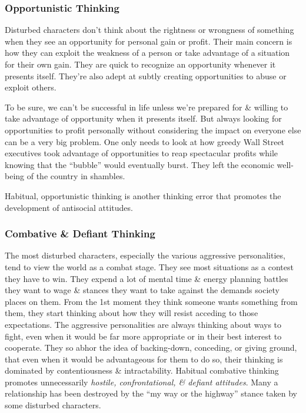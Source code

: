 \documentclass{article}
\numberwithin{equation}{section}
\begin{document}
\subsubsection{Opportunistic Thinking}
Disturbed characters don't think about the rightness or wrongness of something when they see an opportunity for personal gain or profit. Their main concern is how they can exploit the weakness of a person or take advantage of a situation for their own gain. They are quick to recognize an opportunity whenever it presents itself. They're also adept at subtly creating opportunities to abuse or exploit others.

To be sure, we can't be successful in life unless we're prepared for \& willing to take advantage of opportunity when it presents itself. But always looking for opportunities to profit personally without considering the impact on everyone else can be a very big problem. One only needs to look at how greedy Wall Street executives took advantage of opportunities to reap spectacular profits while knowing that the ``bubble'' would eventually burst. They left the economic well-being of the country in shambles.

Habitual, opportunistic thinking is another thinking error that promotes the development of antisocial attitudes.

\subsubsection{Combative \& Defiant Thinking}
The most disturbed characters, especially the various aggressive personalities, tend to view the world as a combat stage. They see most situations as a contest they have to win. They expend a lot of mental time \& energy planning battles they want to wage \& stances they want to take against the demands society places on them. From the 1st moment they think someone wants something from them, they start thinking about how they will resist acceding to those expectations. The aggressive personalities are always thinking about ways to fight, even when it would be far more appropriate or in their best interest to cooperate. They so abhor the idea of backing-down, conceding, or giving ground, that even when it would be advantageous for them to do so, their thinking is dominated by contentiousness \& intractability. Habitual combative thinking promotes unnecessarily \textit{hostile, confrontational, \& defiant attitudes}. Many a relationship has been destroyed by the ``my way or the highway'' stance taken by some disturbed characters.
\end{document}
